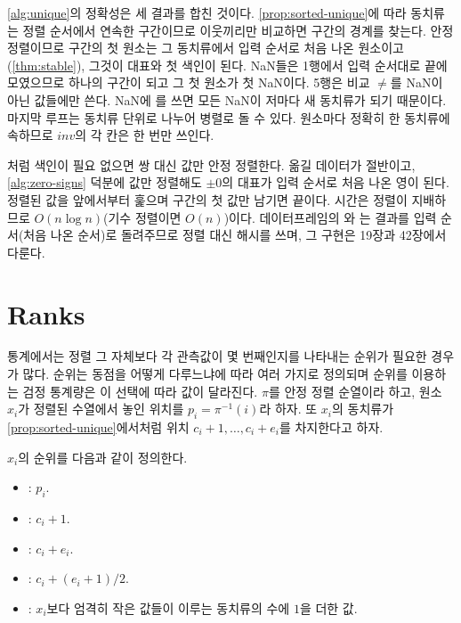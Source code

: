 \cref{alg:unique}의 정확성은 세 결과를 합친 것이다. \cref{prop:sorted-unique}에 따라 동치류는 정렬 순서에서 연속한 구간이므로 이웃끼리만 비교하면 구간의 경계를 찾는다. 안정 정렬이므로 구간의 첫 원소는 그 동치류에서 입력 순서로 처음 나온 원소이고(\cref{thm:stable}), 그것이 대표와 첫 색인이 된다. NaN들은 1행에서 입력 순서대로 끝에 모였으므로 하나의 구간이 되고 그 첫 원소가 첫 NaN이다. 5행은 비교 $\ne$를 NaN이 아닌 값들에만 쓴다. NaN에 \code{!=}를 쓰면 모든 NaN이 저마다 새 동치류가 되기 때문이다. 마지막 루프는 동치류 단위로 나누어 병렬로 돌 수 있다. 원소마다 정확히 한 동치류에 속하므로 $\mathit{inv}$의 각 칸은 한 번만 쓰인다.

처럼 색인이 필요 없으면 쌍 대신 값만 안정 정렬한다. 옮길 데이터가 절반이고, \cref{alg:zero-signs} 덕분에 값만 정렬해도 $\pm0$의 대표가 입력 순서로 처음 나온 영이 된다. 정렬된 값을 앞에서부터 훑으며 구간의 첫 값만 남기면 끝이다. 시간은 정렬이 지배하므로 $O(n\log n)$(기수 정렬이면 $O(n)$)이다. 데이터프레임의 와 는 결과를 입력 순서(처음 나온 순서)로 돌려주므로 정렬 대신 해시를 쓰며, 그 구현은 19장과 42장에서 다룬다.


\section{Ranks}
\label{sec:ranks}

통계에서는 정렬 그 자체보다 각 관측값이 몇 번째인지를 나타내는 순위가 필요한 경우가 많다. 순위는 동점을 어떻게 다루느냐에 따라 여러 가지로 정의되며 순위를 이용하는 검정 통계량은 이 선택에 따라 값이 달라진다. $\pi$를 안정 정렬 순열이라 하고, 원소 $x_i$가 정렬된 수열에서 놓인 위치를 $p_i=\pi^{-1}(i)$라 하자. 또 $x_i$의 동치류가 \cref{prop:sorted-unique}에서처럼 위치 $c_i+1,\dots,c_i+e_i$를 차지한다고 하자.

\begin{definition}[순위]
\label{def:ranks}
$x_i$의 순위를 다음과 같이 정의한다.
\begin{itemize}
\item {}: $p_i$.
\item {}: $c_i+1$.
\item {}: $c_i+e_i$.
\item {}: $c_i+(e_i+1)/2$.
\item {}: $x_i$보다 엄격히 작은 값들이 이루는 동치류의 수에 $1$을 더한 값.
\end{itemize}
\end{definition}


